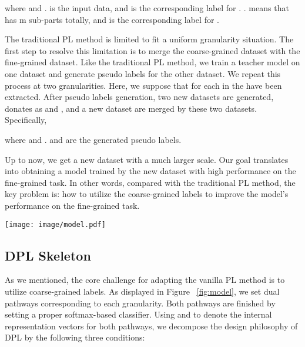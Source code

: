 \documentclass[11pt]{article}
\begin{document}
where  and . 
 is the input data, and  is the corresponding label for .
.  means that  has m sub-parts totally, and  is the corresponding label for .

The traditional PL method is limited to fit a uniform granularity situation.
The first step to resolve this limitation is to merge the coarse-grained dataset with the fine-grained dataset.
Like the traditional PL method, we train a teacher model on one dataset and generate pseudo labels for the other dataset. We repeat this process at two granularities.
Here, we suppose that  for each  in the  have been extracted.
After pseudo labels generation, two new datasets are generated, donates as  and , and a new dataset  are merged by these two datasets.
Specifically, 


where  and .
 and  are the generated pseudo labels.


Up to now, we get a new dataset with a much larger scale. Our goal translates into obtaining a model trained by the new dataset  with high performance on the fine-grained task.
In other words, compared with the traditional PL method, 
the key problem is: how to utilize the coarse-grained labels to improve the model's performance on the fine-grained task.

\begin{figure*}
  \centering
  \texttt{[image: image/model.pdf]} 
  \caption{The Model for the DPL Framework.  is the input data.  indicates the aspect terms, which are painted by the dark green. We first generate  and  as the input of the upper and lower pathways, respectively. In this case,  and . ``'' is an encoder that outputs  and . ``'' is a predictor for the fine-grained task, and ``'' is a predictor for the coarse-grained task. Correspondingly,  is the prediction for the fine-grained task, and  is the prediction for the coarse-grained task. ``mutual-exclusive'' means the information carried by  and  has little overlap.}
  \label{fig:model}
\end{figure*}

\subsection{DPL Skeleton}


As we mentioned, the core challenge for adapting the vanilla PL method is to utilize coarse-grained labels.
As displayed in Figure ~\ref{fig:model}, we set dual pathways corresponding to each granularity. Both pathways are finished by setting a proper softmax-based classifier.
Using  and  to denote the internal representation vectors for both pathways, we decompose the design philosophy of DPL by the following three conditions:
\end{document}
